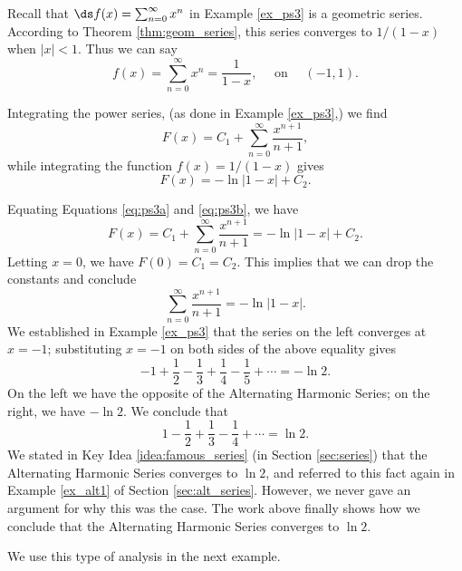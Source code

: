 Recall that $\ds f(x) = \sum_{n=0}^\infty x^n$ in Example \ref{ex_ps3} is a geometric series. According to Theorem \ref{thm:geom_series}, this series converges to $1/(1-x)$ when $|x|<1$. Thus we can say
$$	f(x) = \sum_{n=0}^\infty x^n = \frac 1{1-x},\quad \text{ on }\quad (-1,1).$$

Integrating the power series, (as done in Example \ref{ex_ps3},) we find
\begin{equation} F(x)  = C_1+\sum_{n=0}^\infty \frac{x^{n+1}}{n+1},\label{eq:ps3a}\end{equation}
while integrating the function $f(x) = 1/(1-x)$ gives
\begin{equation} F(x)  = -\ln|1-x| + C_2.\label{eq:ps3b}\end{equation}

Equating Equations \eqref{eq:ps3a} and \eqref{eq:ps3b}, we have 
$$F(x) = C_1+\sum_{n=0}^\infty \frac{x^{n+1}}{n+1} = -\ln|1-x| + C_2.$$
Letting $x=0$, we have $F(0) = C_1 = C_2$. This implies that we can drop the constants and conclude
$$\sum_{n=0}^\infty \frac{x^{n+1}}{n+1} = -\ln|1-x|.$$
We established in Example \ref{ex_ps3} that the series on the left converges at $x=-1$; substituting $x=-1$ on both sides of the above equality gives
$$-1+\frac12-\frac13+\frac14-\frac15+\cdots = -\ln 2.$$
On the left we have the opposite of the Alternating Harmonic Series; on the right, we have $-\ln 2$. We conclude that 
$$1-\frac12+\frac13-\frac14+\cdots = \ln 2.$$
 We stated in Key Idea \ref{idea:famous_series} (in Section \ref{sec:series}) that the Alternating Harmonic Series converges to $\ln 2$, and referred to this fact again in Example \ref{ex_alt1} of Section \ref{sec:alt_series}. However, we never gave an argument for why this was the case. The work above finally shows how we conclude that the Alternating Harmonic Series converges to $\ln 2$. 

We use this type of analysis in the next example.\\

